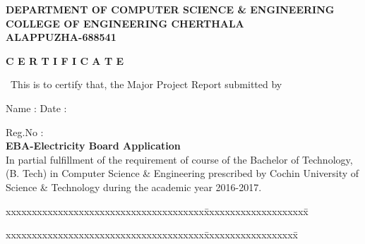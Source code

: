 \documentclass[12pt,a4paper,oneside]{report}
\begin{document}
\begin{titlepage}
\begin{center}

\large{\textbf{DEPARTMENT OF COMPUTER SCIENCE \& ENGINEERING}}\\
\large{\textbf{COLLEGE OF ENGINEERING CHERTHALA\\ALAPPUZHA-688541}}\\
\end{center}
\begin{figure}[h]
\begin{center}
\end{center}
\end{figure}
\begin{center}
\large{\textbf{C E R T I F I C A T E}}\\
\end{center}
\begin{spacing}{1.5}
\begin{center}
\par\ This is to certify that, the Major Project Report submitted by \\
\end{center}
\raggedright Name \hspace{0.21in}: \hspace{0.21in}\hspace{3.4in}Date \hspace{0.1in}: \\
\raggedright Reg.No \hspace{0.10in}: \hspace{0.21in}\\
\centering \textbf{EBA-Electricity Board Application}\\
\justify
In partial fulfillment of the requirement of course of the Bachelor of Technology, (B. Tech) in Computer Science \& Engineering prescribed by Cochin University of Science \& Technology during the academic year 2016-2017.\\ 
\end{spacing}
\begin{tabbing}
xxxxxxxxxxxxxxxxxxxxxxxxxxxxxxxxxxxxxx\= xxxxxxxxxxxxxxxxxxxx\= \kill
\hspace{.4in}{\bf Guide} \>\hspace{-.5in}{\bf Co-ordinator}\hspace{1.7in}{\bf  HoD  } \\
\end{tabbing}
\begin{tabbing}
xxxxxxxxxxxxxxxxxxxxxxxxxxxxxxxxxxxxxx\= xxxxxxxxxxxxxxxxxx\= \kill

\end{tabbing}
\end{titlepage}
\end{document}
